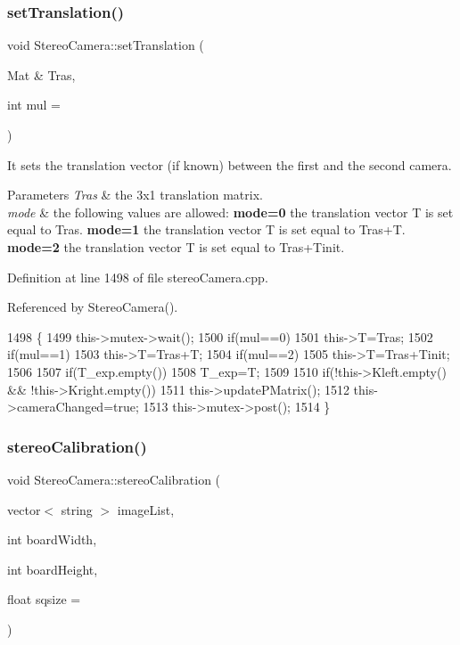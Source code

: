 \subsubsection{\texorpdfstring{set\+Translation()}{setTranslation()}}
{\footnotesize\ttfamily void Stereo\+Camera\+::set\+Translation (\begin{DoxyParamCaption}\item[{Mat \&}]{Tras,  }\item[{int}]{mul = {} }\end{DoxyParamCaption})}



It sets the translation vector (if known) between the first and the second camera. 


\begin{DoxyParams}{Parameters}
{\em Tras} & the 3x1 translation matrix. \\
\hline
{\em mode} & the following values are allowed\+: {\bfseries mode=0} the translation vector T is set equal to Tras. {\bfseries mode=1} the translation vector T is set equal to Tras+T. {\bfseries mode=2} the translation vector T is set equal to Tras+\+Tinit. \\
\hline
\end{DoxyParams}


Definition at line 1498 of file stereo\+Camera.\+cpp.



Referenced by Stereo\+Camera().


\begin{DoxyCode}
1498                                                     \{
1499     this->mutex->wait();
1500     \textcolor{keywordflow}{if}(mul==0)
1501         this->T=Tras;
1502     \textcolor{keywordflow}{if}(mul==1)
1503         this->T=Tras+T;
1504     \textcolor{keywordflow}{if}(mul==2)
1505         this->T=Tras+Tinit;
1506 
1507     \textcolor{keywordflow}{if}(T\_exp.empty())
1508         T\_exp=T;
1509 
1510     \textcolor{keywordflow}{if}(!this->Kleft.empty() && !this->Kright.empty())
1511         this->updatePMatrix();
1512     this->cameraChanged=\textcolor{keyword}{true};
1513     this->mutex->post();
1514 \}
\end{DoxyCode}
\mbox{\label{classStereoCamera_a398f45eeefe7979a834659cfbb7a6961}} 
\subsubsection{\texorpdfstring{stereo\+Calibration()}{stereoCalibration()}}
{\footnotesize\ttfamily void Stereo\+Camera\+::stereo\+Calibration (\begin{DoxyParamCaption}\item[{vector$<$ string $>$}]{image\+List,  }\item[{int}]{board\+Width,  }\item[{int}]{board\+Height,  }\item[{float}]{sqsize = {} }\end{DoxyParamCaption})}



